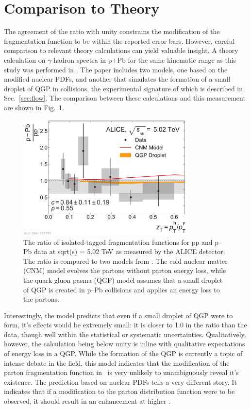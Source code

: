 \section{Comparison to Theory}
The agreement of the ratio with unity constrains the modification of the fragmentation function to be within the reported error bars. However, careful comparison to relevant theory calculations can yield valuable insight. A theory calculation on $\gamma$-hadron spectra in p+Pb for the same kinematic range as this study was performed in \cite{Xie2021}. The paper includes two models, one based on the modified nuclear PDFs, and another that simulates the formation of a small droplet of QGP in \pPb collisions, the experimental signature of which is described in Sec.~\ref{sec:flow}. The comparison between these calculations and this measurement are shown in Fig.~\ref{fig:FF_model}.
\begin{figure}[htpb]
  \centering
  \includegraphics[width=0.8\textwidth]{FF_Model_Comparisons_Ratio.pdf}
  \caption{The ratio of isolated-tagged fragmentation functions for pp and p–Pb data at sqrt(s) = 5.02 TeV as measured by the ALICE detector.  The ratio is compared to two models from \cite{Xie2021}. The cold nuclear matter (CNM) model evolves the partons without parton energy loss, while the quark gluon pasma (QGP) model assumes that a small droplet of QGP is created in p–Pb collisions and applies an energy loss to the partons.}
  \label{fig:FF_model}
\end{figure}

Interestingly, the model predicts that even if a small droplet of QGP were to form, it's effects would be extremely small: it is closer to 1.0 in the ratio than the data, though well within the statistical or systematic uncertainties. Qualitatively, however, the calculation being below unity is inline with qualitative expectations of energy loss in a QGP. While the formation of the QGP is currently a topic of intense debate in the field, this model indicates that the modification of the parton fragmentation function in \pPb~is very unlikely to unambiguously reveal it's existence. The prediction based on nuclear PDFs tells a very different story. It indicates that if a modification to the parton distribution function were to be observed, it should result in an enhancement at higher \zt. 

